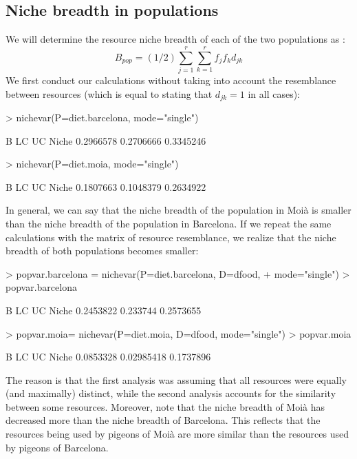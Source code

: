 \documentclass[11pt,a4paper]{article}
\begin{document}
\subsection{Niche breadth in populations}
We will determine the resource niche breadth of each of the two populations as \citep{DeCaceres2011}: 
\[
B_{pop} = (1/2)\sum_{j=1}^r\sum_{k=1}^r{f_jf_kd_{jk}}
\]
We first conduct our calculations without taking into account the resemblance between resources (which is equal to stating that $d_{jk}=1$ in all cases):
\begin{Schunk}
\begin{Sinput}
> nichevar(P=diet.barcelona, mode="single")
\end{Sinput}
\begin{Soutput}
              B        LC        UC
Niche 0.2966578 0.2706666 0.3345246
\end{Soutput}
\begin{Sinput}
> nichevar(P=diet.moia, mode="single")
\end{Sinput}
\begin{Soutput}
              B        LC        UC
Niche 0.1807663 0.1048379 0.2634922
\end{Soutput}
\end{Schunk}
In general, we can say that the niche breadth of the population in Moià is smaller than the niche breadth of the population in Barcelona. If we repeat the same calculations with the matrix of resource resemblance, we realize that the niche breadth of both populations becomes smaller:
\begin{Schunk}
\begin{Sinput}
> popvar.barcelona = nichevar(P=diet.barcelona, D=dfood, 
+                             mode="single")
> popvar.barcelona
\end{Sinput}
\begin{Soutput}
              B       LC        UC
Niche 0.2453822 0.233744 0.2573655
\end{Soutput}
\begin{Sinput}
> popvar.moia= nichevar(P=diet.moia, D=dfood, mode="single")
> popvar.moia
\end{Sinput}
\begin{Soutput}
              B         LC        UC
Niche 0.0853328 0.02985418 0.1737896
\end{Soutput}
\end{Schunk}
The reason is that the first analysis was assuming that all resources were equally (and maximally) distinct, while the second analysis accounts for the similarity between some resources. Moreover, note that the niche breadth of Moià has decreased more than the niche breadth of Barcelona. This reflects that the resources being used by pigeons of Moià are more similar than the resources used by pigeons of Barcelona.
\end{document}
